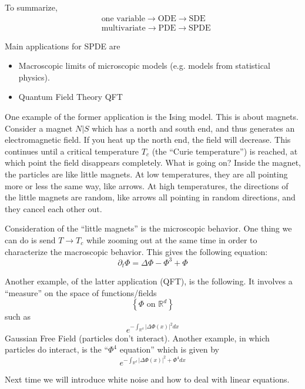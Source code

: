 \documentclass{article}
\def\R{\mathbb{R}} %
\begin{document}
To summarize,
\begin{align*}
  &\text{one variable}\rightarrow \text{ODE}\rightarrow \text{SDE}\\
  &\text{multivariate}\rightarrow \text{PDE}\rightarrow \text{SPDE} 
\end{align*}

Main applications for SPDE are
\begin{itemize}
  \item Macroscopic limits of microscopic models (e.g. models from statistical
  physics). 
  \item Quantum Field Theory QFT
\end{itemize}

One example of the former application is the Ising model. This is about magnets.
Consider a magnet $N|S$ which has a north and south end, and thus generates an
electromagnetic field. If you heat up the north end, the field will decrease.
This continues until a critical temperature $T_{c}$ (the ``Curie temperature'')
is reached, at which point the field disappears completely. What is going on?
Inside the magnet, the particles are like little magnets. At low temperatures,
they are all pointing more or less the same way, like arrows. At high
temperatures, the directions of the little magnets are random, like arrows all
pointing in random directions, and they cancel each other out.

Consideration of the ``little magnets'' is the microscopic behavior. One thing
we can do is send $T \to T_{c}$ while zooming out at the same time in order to
characterize the macroscopic behavior. This gives the following equation:
\begin{equation*}
  \partial_{t}\Phi = \Delta \Phi - \Phi^{3}+ \Phi
\end{equation*}


Another example, of the latter application (QFT), is the following. It involves
a ``measure'' on the space of functions/fields
\begin{equation*}
  \left\{\Phi \text{ on } \R^d \right\}
\end{equation*}
such as
\begin{equation*}
  e^{-\int_{\R^d }|\Delta \Phi(x)|^{2}dx }
\end{equation*}
Gaussian Free Field (particles don't interact). Another example, in which
particles do interact, is the ``$\Phi^{4}$ equation'' which is given by 
\begin{equation*}
  e^{-\int_{\R^d }|\Delta \Phi(x)|^{2} +\Phi^{4}dx }
\end{equation*}


Next time we will introduce white noise and how to deal with linear equations.
\end{document}
